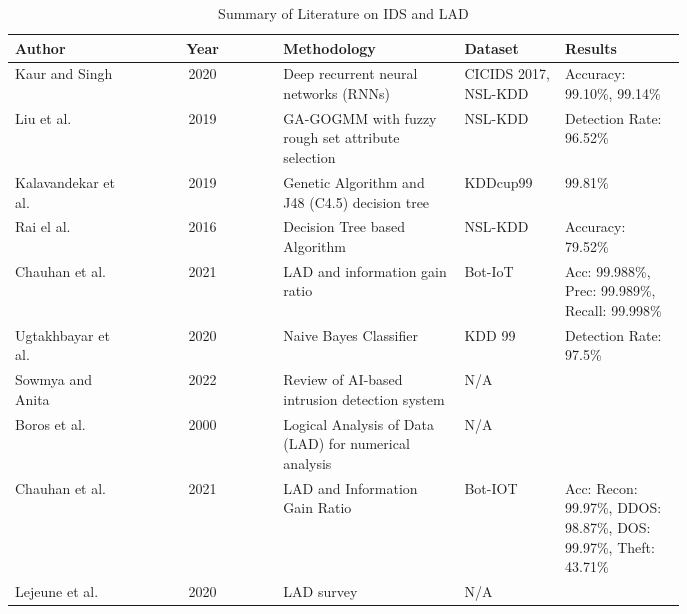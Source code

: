 \documentclass[pdflatex,sn-mathphys-num]{sn-jnl}%
\let\oldcaption\caption
\renewcommand{\caption}[1]{\oldcaption{\centering #1}}
\theoremstyle{thmstyleone}%
\theoremstyle{thmstyletwo}%
\theoremstyle{thmstylethree}%
\begin{document}
\begin{table}[ht]
  \centering
  \caption{Summary of Literature on IDS and LAD}
  \label{tab:litreview}
  \begin{tabular}{|p{0.18\linewidth}|c|p{0.27\linewidth}|p{0.15\linewidth}|p{0.18\linewidth}|}
    \hline
    \textbf{Author}                  & \textbf{Year} & \textbf{Methodology}                                  & \textbf{Dataset}     & \textbf{Results}                                                 \\ \hline
    Kaur and Singh \cite{IDS12}      & 2020          & Deep recurrent neural networks (RNNs)                 & CICIDS 2017, NSL-KDD & Accuracy: 99.10\%, 99.14\%                                       \\ \hline
    Liu et al. \cite{IDS3}           & 2019          & GA-GOGMM with fuzzy rough set attribute selection     & NSL-KDD              & Detection Rate: 96.52\%                                          \\ \hline
    Kalavandekar et al. \cite{IDS10} & 2019          & Genetic Algorithm and J48 (C4.5) decision tree        & KDDcup99             & 99.81\%                                                          \\ \hline
    Rai el al. \cite{IDS12}          & 2016          & Decision Tree based Algorithm                         & NSL-KDD              & Accuracy: 79.52\%                                                \\ \hline
    Chauhan et al. \cite{LAD7}       & 2021          & LAD and information gain ratio                        & Bot-IoT              & Acc: 99.988\%, Prec: 99.989\%, Recall: 99.998\%                  \\ \hline
    Ugtakhbayar et al. \cite{IDS6}   & 2020          & Naive Bayes Classifier                                & KDD 99               & Detection Rate: 97.5\%                                           \\ \hline
    Sowmya and Anita \cite{IDS5}     & 2022          & Review of AI-based intrusion detection system         & N/A                  &                                                                  \\ \hline
    Boros et al. \cite{LAD1}         & 2000          & Logical Analysis of Data (LAD) for numerical analysis & N/A                  &                                                                  \\ \hline
    Chauhan et al. \cite{LAD7}       & 2021          & LAD and Information Gain Ratio                        & Bot-IOT              & Acc: Recon: 99.97\%, DDOS: 98.87\%, DOS: 99.97\%, Theft: 43.71\% \\ \hline
    Lejeune et al. \cite{LAD4}       & 2020          & LAD survey                                            & N/A                  &                                                                  \\ \hline
  \end{tabular}
\end{table}
\end{document}
